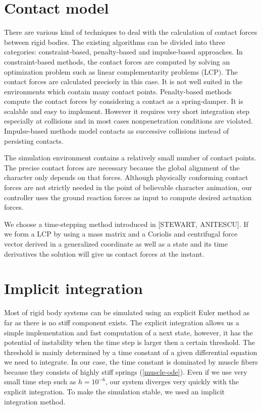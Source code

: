 \documentclass[a4paper,10pt]{article}
\begin{document}
\section{Contact model}
There are various kind of techniques to deal with the calculation of
contact forces between rigid bodies. The existing algorithms can be
divided into three categories: constraint-based, penalty-based and
impulse-based approaches. In constraint-based methods, the contact
forces are computed by solving an optimization problem such as
linear complementarity problems (LCP). The contact forces are calculated
precisely in this case. It is not well suited in the environments
which contain many contact points. Penalty-based methods compute
the contact forces by considering a contact as a spring-damper.
It is scalable and easy to implement. However it requires very short
integration step especially at collisions and in most cases nonpenetration
conditions are violated. Impulse-based methods model contacts
as successive collisions instead of persisting contacts.

The simulation environment contains a relatively small number
of contact points. The precise contact forces are necessary because
the global alignment of the character only depends on that forces.
Although physically conforming contact forces are not strictly needed in
the point of believable character animation, our controller uses the
ground reaction forces as input to compute desired actuation forces.

We choose a time-stepping method introduced in [STEWART, ANITESCU].
If we form a LCP by using a mass matrix and a Coriolis and centrifugal force vector
derived in a generalized coordinate as well as a state and its time derivatives
the solution will give us contact forces at the instant.


\section{Implicit integration}

Most of rigid body systems can be simulated using an explicit Euler method
as far as there is no stiff component exists. The explicit integration
allows us a simple implementation and fast computation of a next state,
however, it has the potential of instability when the time step is larger
then a certain threshold. The threshold is mainly determined by a time
constant of a given differential equation we need to integrate. In our case, the time
constant is dominated by muscle fibers because they consists
of highly stiff springs (\ref{muscle-ode}). Even if we use very small time step
such as $h=10^{-6}$, our system diverges very quickly with the explicit
integration. To make the simulation stable, we used an implicit integration
method.
\end{document}
